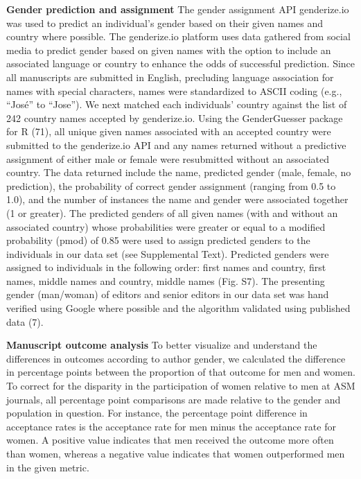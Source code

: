 \documentclass[11pt,]{article}
\begin{document}
\textbf{Gender prediction and assignment} The gender assignment API
genderize.io was used to predict an individual's gender based on their
given names and country where possible. The genderize.io platform uses
data gathered from social media to predict gender based on given names
with the option to include an associated language or country to enhance
the odds of successful prediction. Since all manuscripts are submitted
in English, precluding language association for names with special
characters, names were standardized to ASCII coding (e.g., ``José'' to
``Jose''). We next matched each individuals' country against the list of
242 country names accepted by genderize.io. Using the GenderGuesser
package for R (71), all unique given names associated with an accepted
country were submitted to the genderize.io API and any names returned
without a predictive assignment of either male or female were
resubmitted without an associated country. The data returned include the
name, predicted gender (male, female, no prediction), the probability of
correct gender assignment (ranging from 0.5 to 1.0), and the number of
instances the name and gender were associated together (1 or greater).
The predicted genders of all given names (with and without an associated
country) whose probabilities were greater or equal to a modified
probability (pmod) of 0.85 were used to assign predicted genders to the
individuals in our data set (see Supplemental Text). Predicted genders
were assigned to individuals in the following order: first names and
country, first names, middle names and country, middle names (Fig. S7).
The presenting gender (man/woman) of editors and senior editors in our
data set was hand verified using Google where possible and the algorithm
validated using published data (7).

\textbf{Manuscript outcome analysis} To better visualize and understand
the differences in outcomes according to author gender, we calculated
the difference in percentage points between the proportion of that
outcome for men and women. To correct for the disparity in the
participation of women relative to men at ASM journals, all percentage
point comparisons are made relative to the gender and population in
question. For instance, the percentage point difference in acceptance
rates is the acceptance rate for men minus the acceptance rate for
women. A positive value indicates that men received the outcome more
often than women, whereas a negative value indicates that women
outperformed men in the given metric.
\end{document}
